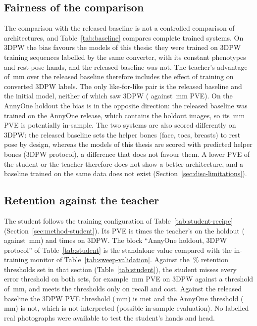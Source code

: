 \subsection{Fairness of the comparison}
\label{sec:res-fairness}

The comparison with the released baseline is not a controlled comparison of architectures, and
Table~\ref{tab:baseline} compares complete trained systems. On 3DPW the bias favours the models of this thesis: they
were trained on 3DPW training sequences labelled by the same converter, with its constant phenotypes and rest-pose
hands, and the released baseline was not. The teacher's advantage of \FinalGainOverNAVERThreeDPW\,mm over the
released baseline therefore includes the effect of training on converted 3DPW labels. The only like-for-like pair is
the released baseline and the initial model, neither of which saw 3DPW (\NAVERThreeDPW{} against \BaseThreeDPW\,mm
PVE). On the AnnyOne holdout the bias is in the opposite direction: the released baseline was trained on the AnnyOne
release, which contains the \MethodHoldoutN{} holdout images, so its \NAVERAnnyOne\,mm PVE is potentially in-sample.
The two systems are also scored differently on 3DPW: the released baseline sets the helper bones (face, toes,
breasts) to rest pose by design, whereas the models of this thesis are scored with predicted helper bones (3DPW protocol), a
difference that does not favour them. A lower PVE of the student or the teacher therefore does not show
a better architecture, and a baseline trained on the same data does not exist (Section~\ref{sec:disc-limitations}).

\subsection{Retention against the teacher}
\label{sec:res-student}



The student follows the training configuration of Table~\ref{tab:student-recipe}
(Section~\ref{sec:method-student}). Its PVE is \StudentRatioPVE{} times the teacher's on the holdout (\StudentPVE{}
against \FinalPVE\,mm) and \StudentRatioThreeDPW{} times on 3DPW. The block ``AnnyOne holdout, 3DPW protocol'' of
Table~\ref{tab:student} is the standalone value compared with the in-training monitor of
Table~\ref{tab:sweep-validation}. Against the \BgNinetyFive\,\% retention thresholds
set in that section (Table~\ref{tab:student}), the student misses every error threshold on both sets, for example
\StudentThreeDPW\,mm PVE on 3DPW against a threshold of \BarThreeDPW\,mm, and meets the thresholds only on recall and
cost. Against the released baseline the 3DPW PVE threshold (\BarNAVERThreeDPW\,mm) is met and the AnnyOne threshold
(\BarNAVERAnnyOne\,mm) is not, which is not interpreted (possible in-sample evaluation). No labelled real photographs
were available to test the student's hands and head.

